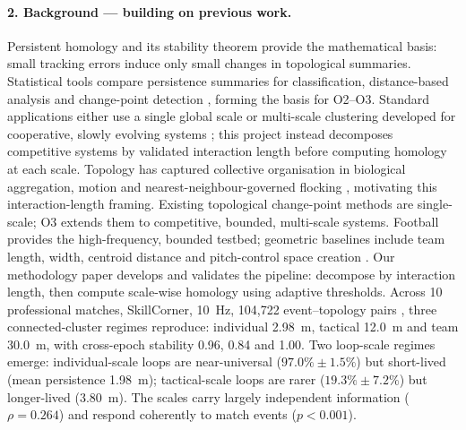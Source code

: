 \paragraph{2. Background --- building on previous work.}
Persistent homology \citep{Carlsson2009,Zomorodian2005} and its stability theorem \citep{CohenSteiner2007} provide the mathematical basis: small tracking errors induce only small changes in topological summaries. Statistical tools compare persistence summaries for classification, distance-based analysis and change-point detection \citep{Chazal2014,Bubenik2015,Adams2017}, forming the basis for O2--O3. Standard applications either use a single global scale \citep{Edelsbrunner2010} or multi-scale clustering developed for cooperative, slowly evolving systems \citep{SchindlerBarahona2023}; this project instead decomposes competitive systems by validated interaction length before computing homology at each scale. Topology has captured collective organisation in biological aggregation, motion and nearest-neighbour-governed flocking \citep{Topaz2015,Bhaskar2019,Ballerini2008}, motivating this interaction-length framing. Existing topological change-point methods \citep{Gu2022} are single-scale; O3 extends them to competitive, bounded, multi-scale systems. Football provides the high-frequency, bounded testbed; geometric baselines include team length, width, centroid distance \citep{Folgado2014} and pitch-control space creation \citep{FernandezBornn2018}. Our methodology paper \citep{Brown2026} develops and validates the pipeline: decompose by interaction length, then compute scale-wise homology using adaptive thresholds. Across 10 professional matches, SkillCorner, 10~Hz, 104{,}722 event--topology pairs \citep{Brown2026}, three connected-cluster regimes reproduce: individual 2.98~m, tactical 12.0~m and team 30.0~m, with cross-epoch stability 0.96, 0.84 and 1.00. Two loop-scale regimes emerge: individual-scale loops are near-universal ($97.0\% \pm 1.5\%$) but short-lived (mean persistence 1.98~m); tactical-scale loops are rarer ($19.3\% \pm 7.2\%$) but longer-lived (3.80~m). The scales carry largely independent information ($\rho = 0.264$) and respond coherently to match events ($p < 0.001$).

